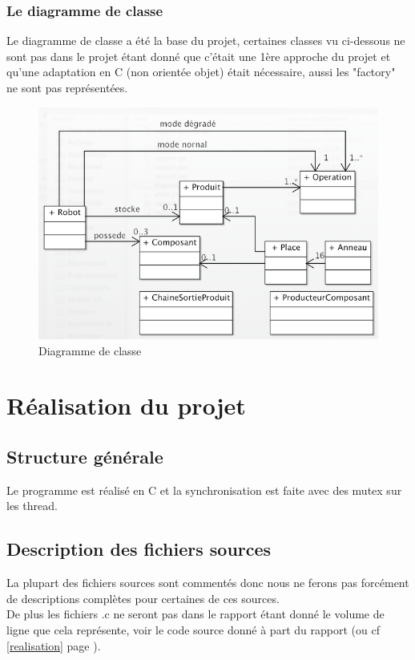 \documentclass{report}
\begin{document}
\subsection{Le diagramme de classe}
Le diagramme de classe a été la base du projet, certaines classes vu ci-dessous ne sont pas dans le projet étant donné que c'était une 1ère approche du projet et qu'une adaptation en C (non orientée objet) était nécessaire, aussi les "factory" ne sont pas représentées.
\begin{figure}[H]
\center
\includegraphics[width=400pt]{diag.png}
\caption{Diagramme de classe}
\label{Diagramme de classe}
\end{figure}

\chapter{Réalisation du projet}
\section{Structure générale}
Le programme est réalisé en C et la synchronisation est faite avec des mutex sur les thread.
\section{Description des fichiers sources}
La plupart des fichiers sources sont commentés donc nous ne ferons pas forcément de descriptions complètes pour certaines de ces sources.\\
De plus les fichiers .c ne seront pas dans le rapport étant donné le volume de ligne que cela représente, voir le code source donné à part du rapport (ou cf \ref{realisation} page \pageref{realisation}).
\end{document}
